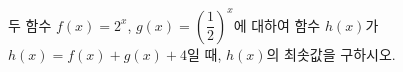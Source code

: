 두 함수 $f(x)=2^x$, $g(x)=\left(\dfrac{1}{2}\right)^{x}$에 대하여 함수 $h(x)$가 $h(x)=f(x)+g(x)+4$일 때, $h(x)$의 최솟값을 구하시오.
